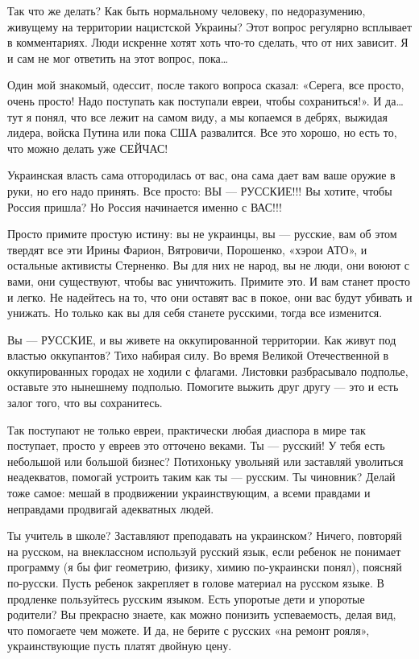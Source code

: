 Так что же делать? Как быть нормальному человеку, по недоразумению, живущему на
территории нацистской Украины? Этот вопрос регулярно всплывает в комментариях.
Люди искренне хотят хоть что-то сделать, что от них зависит. Я и сам не мог
ответить на этот вопрос, пока…

Один мой знакомый, одессит, после такого вопроса сказал: «Серега, все просто,
очень просто! Надо поступать как поступали евреи, чтобы сохраниться!». И да…
тут я понял, что все лежит на самом виду, а мы копаемся в дебрях, выжидая
лидера, войска Путина или пока США развалится. Все это хорошо, но есть то, что
можно делать уже СЕЙЧАС!

Украинская власть сама отгородилась от вас, она сама дает вам ваше оружие в
руки, но его надо принять. Все просто: ВЫ --- РУССКИЕ!!! Вы хотите, чтобы Россия
пришла? Но Россия начинается именно с ВАС!!!

Просто примите простую истину: вы не украинцы, вы --- русские, вам об этом
твердят все эти Ирины Фарион, Вятровичи, Порошенко, «хэрои АТО», и остальные
активисты Стерненко. Вы для них не народ, вы не люди, они воюют с вами, они
существуют, чтобы вас уничтожить. Примите это. И вам станет просто и легко. Не
надейтесь на то, что они оставят вас в покое, они вас будут убивать и унижать.
Но только как вы для себя станете русскими, тогда все изменится.

Вы --- РУССКИЕ, и вы живете на оккупированной территории. Как живут под властью
оккупантов? Тихо набирая силу. Во время Великой Отечественной в оккупированных
городах не ходили с флагами. Листовки разбрасывало подполье, оставьте это
нынешнему подполью. Помогите выжить друг другу --- это и есть залог того, что вы
сохранитесь.

Так поступают не только евреи, практически любая диаспора в мире так поступает,
просто у евреев это отточено веками. Ты --- русский! У тебя есть небольшой или
большой бизнес? Потихоньку увольняй или заставляй уволиться неадекватов,
помогай устроить таким как ты --- русским. Ты чиновник? Делай тоже самое: мешай в
продвижении украинствующим, а всеми правдами и неправдами продвигай адекватных
людей.

Ты учитель в школе? Заставляют преподавать на украинском? Ничего, повторяй на
русском, на внеклассном используй русский язык, если ребенок не понимает
программу (я бы фиг геометрию, физику, химию по-украински понял), поясняй
по-русски. Пусть ребенок закрепляет в голове материал на русском языке. В
продленке пользуйтесь русским языком. Есть упоротые дети и упоротые родители?
Вы прекрасно знаете, как можно понизить успеваемость, делая вид, что помогаете
чем можете. И да, не берите с русских «на ремонт рояля», украинствующие пусть
платят двойную цену.

